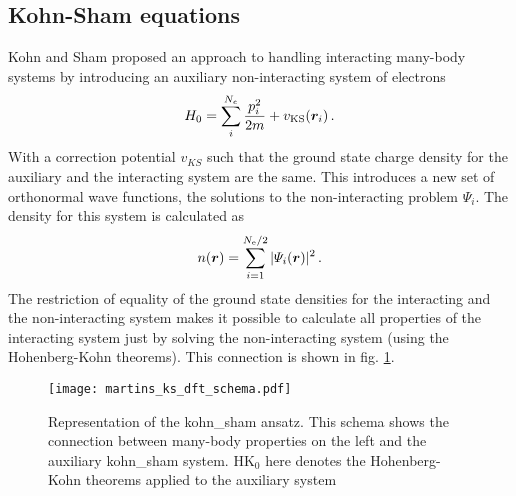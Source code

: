 \documentclass[main.tex]{subfiles}
\begin{document}
\subsection{Kohn-Sham equations}

Kohn and Sham proposed an approach to handling interacting many-body systems by introducing an auxiliary non-interacting system of electrons \cite{kohn_self-consistent_1965}
\begin{equation}\label{eq:kohn_sham_hamiltonian}
    H_0 = \sum_i^{N_e} \frac{p_i^2}{2m} + v_{\mathrm{KS}} (\vb*{r}_i)\,.
\end{equation}
With a correction potential \(v_{KS}\) such that the ground state charge density for the auxiliary and the interacting system are the same.
This introduces a new set of orthonormal wave functions, the solutions to the non-interacting problem \(\Psi_i\).
The density for this system is calculated as
\begin{equation}\label{eq:density_ks_states}
    n(\vb*{r}) = \sum_{i=1}^{N_{\mathrm{e}} / 2} \vert \Psi_i (\vb*{r}) \vert^2\,.
\end{equation}
The restriction of equality of the ground state densities for the interacting and the non-interacting system makes it possible to calculate all properties of the interacting system just by solving the non-interacting system (using the Hohenberg-Kohn theorems).
This connection is shown in fig. \ref{fig:kohn_sham_dft_schema}.
\begin{figure}[ht!]
    \centering
    \texttt{[image: martins\_ks\_dft\_schema.pdf]}
    \caption{Representation of the \acrshort{kohn_sham} ansatz. This schema shows the connection between many-body properties on the left and the auxiliary \acrshort{kohn_sham} system. \(\mathrm{HK}_0\) here denotes the Hohenberg-Kohn theorems applied to the auxiliary system \cite[137]{martin_electronic_2004}}
    \label{fig:kohn_sham_dft_schema}
\end{figure}
\end{document}
